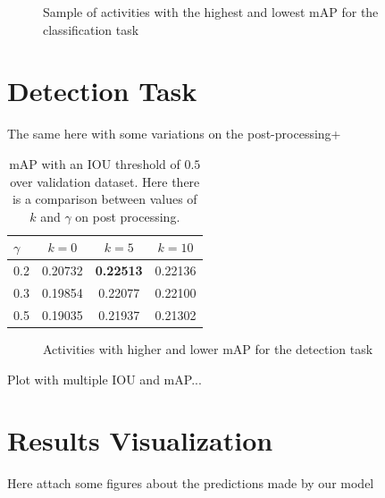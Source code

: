 \begin{figure}[H]
\begin{center}
\end{center}
\caption{Sample of activities with the highest and lowest mAP for the classification task}
\label{fig:map_by_activity_classification}
\end{figure}

\begin{figure}[H]
\begin{center}
\end{center}
\caption{}
\label{fig:confussion_matrix}
\end{figure}

\section{Detection Task}

The same here with some variations on the post-processing+

\begin{table}[H]
\begin{center}
\begin{tabular}{|l|c|c|c|}
\hline
$\gamma$ & $k=0$ & $k=5$ & $k=10$ \\
\hline
0.2 & 0.20732 & \bf0.22513 & 0.22136 \\
0.3 & 0.19854 & 0.22077 & 0.22100 \\
0.5 & 0.19035 & 0.21937 & 0.21302 \\
\hline
\end{tabular}
\end{center}
\caption{mAP with an IOU threshold of $0.5$ over validation dataset. Here there is a comparison
between values of $k$ and $\gamma$ on post processing.}
\label{table:detection_comparison}
\end{table}


\begin{figure}[H]
\begin{center}
\end{center}
\caption{Activities with higher and lower mAP for the detection task}
\label{fig:map_by_activity_detection}
\end{figure}

Plot with multiple IOU and mAP...

\section{Results Visualization}

Here attach some figures about the predictions made by our model

